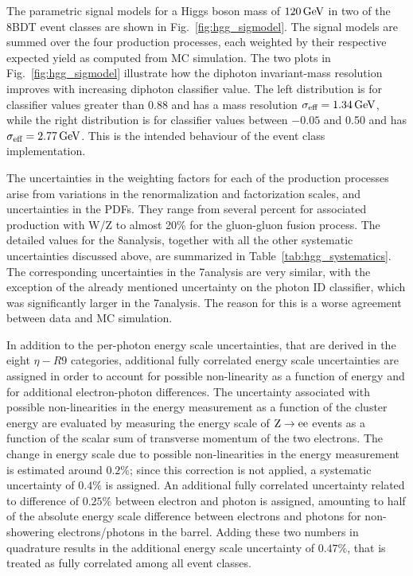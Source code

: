 \documentclass[11pt,twoside,a4paper,cmspaper,final,collab]{cms-tdr}
\begin{document}
The parametric signal models for a Higgs boson mass of
$120\,\text{Ge\hspace{-.08em}V}$ in two of the 8\TeV BDT event classes are shown in
Fig.~\ref{fig:hgg_sigmodel}. The signal models are
summed over the four production processes, each weighted by their respective
expected yield as computed from MC simulation.
The two plots in Fig.~\ref{fig:hgg_sigmodel} illustrate how the
diphoton invariant-mass resolution improves with increasing diphoton classifier value.
The left distribution is for classifier
values greater than 0.88 and has a mass
resolution $\sigma_{\text{eff}} = 1.34\,\text{Ge\hspace{-.08em}V}$, while the
right distribution is for classifier values
between $-0.05$ and 0.50 and has $\sigma_{\text{eff}} = 2.77\,\text{Ge\hspace{-.08em}V}$.
This is the intended behaviour of the event class implementation.

The uncertainties in the weighting factors for each of the production processes
arise from variations in the renormalization
and factorization scales, and uncertainties in the PDFs.
They range from several percent for associated production with W/Z to almost 20\%
for the gluon-gluon fusion process. The detailed values for the 8\TeV analysis, together with
all the other systematic uncertainties discussed above, are summarized in
Table~\ref{tab:hgg_systematics}. The corresponding uncertainties in the 7\TeV analysis are very similar,
with the exception of the already mentioned uncertainty on the photon ID classifier, which
was significantly larger in the 7\TeV analysis.
The reason for this is a worse agreement between data and MC simulation.

In addition to the per-photon energy scale uncertainties, that are derived in the eight $\eta-R9$
categories, additional fully correlated energy scale uncertainties are assigned in order to account
for possible non-linearity as a function of energy and for additional electron-photon
differences. The uncertainty associated with possible non-linearities in the energy measurement as a
function of the cluster energy are evaluated by measuring the energy scale of $\mathrm{Z}\to \mathrm{e}\mathrm{e}$ events as a
function of the scalar sum of  transverse momentum of the two electrons. The change in energy
scale due to possible non-linearities in the energy measurement is
estimated around $0.2\%$; since this correction is not applied, a
systematic uncertainty of $0.4\%$ is assigned.
An additional  fully correlated uncertainty related to difference of $0.25\%$
between  electron and photon is assigned,
amounting to half of the absolute energy scale difference between electrons and photons
for non-showering electrons/photons in the barrel. Adding these two numbers in quadrature results
in the additional energy scale uncertainty of $0.47\%$, that is treated as
fully correlated among all event classes.
\end{document}

